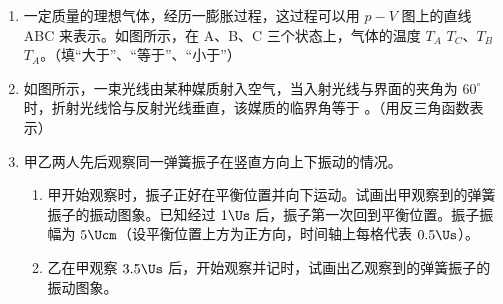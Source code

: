 \documentclass[\gkver]{gaokaozhenti}
\begin{document}
\begin{enumerate}
\item
一定质量的理想气体，经历一膨胀过程，这过程可以用 $p-V$ 图上的直线 ABC 来表示。如图所示，在 A、B、C 三个状态上，气体的温度 $T_{A}$  $T_{C}$、$T_{B}$  $T_{A}$。（填“大于”、“等于”、“小于”）
\onepicture[align=right, w=4.59cm]{}

\item
如图所示，一束光线由某种媒质射入空气，当入射光线与界面的夹角为 $60^{\circ}$ 时，折射光线恰与反射光线垂直，该媒质的临界角等于 。（用反三角函数表示）
\onepicture[align=right, w=4.75cm]{}

\item
甲乙两人先后观察同一弹簧振子在竖直方向上下振动的情况。
\begin{enumerate}
	\item
	甲开始观察时，振子正好在平衡位置并向下运动。试画出甲观察到的弹簧振子的振动图象。已知经过 $1\Us$ 后，振子第一次回到平衡位置。振子振幅为 $5\Ucm$（设平衡位置上方为正方向，时间轴上每格代表 $0.5\Us$）。
	\item
	乙在甲观察 $3.5\Us$ 后，开始观察并记时，试画出乙观察到的弹簧振子的振动图象。
\end{enumerate}
\drawpicanswer{\onepicture[align=right, w=6.00cm]{}}{\onepicture[align=right, w=9.00cm]{}}


\end{enumerate}
\end{document}
